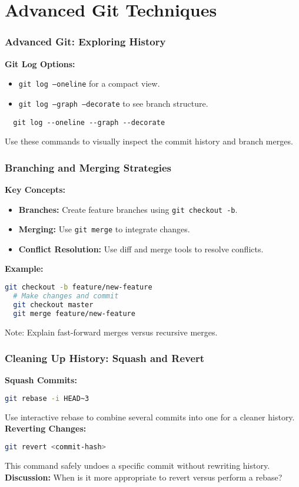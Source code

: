 \documentclass{beamer}
\begin{document}
\section{Advanced Git Techniques}
\begin{frame}[fragile]
	\frametitle{Advanced Git: Exploring History}
	\textbf{Git Log Options:}
	\begin{itemize}
		\item \texttt{git log --oneline} for a compact view.
		\item \texttt{git log --graph --decorate} to see branch structure.
	\end{itemize}
	\vfill
	\lstset{language=bash}
	\begin{lstlisting}
  git log --oneline --graph --decorate
  \end{lstlisting}
	\vfill
	\pause
	Use these commands to visually inspect the commit history and branch merges.
\end{frame}

\begin{frame}[fragile]
	\frametitle{Branching and Merging Strategies}
	\textbf{Key Concepts:}
	\begin{itemize}
		\item \textbf{Branches:} Create feature branches using \texttt{git checkout -b}.
		\item \textbf{Merging:} Use \texttt{git merge} to integrate changes.
		\item \textbf{Conflict Resolution:} Use diff and merge tools to resolve conflicts.
	\end{itemize}
	\vfill
	\textbf{Example:}
	\begin{lstlisting}[language=bash]
  git checkout -b feature/new-feature
  # Make changes and commit
  git checkout master
  git merge feature/new-feature
  \end{lstlisting}
	\vfill
	\alert{Note:} Explain fast-forward merges versus recursive merges.
\end{frame}

\begin{frame}[fragile]
	\frametitle{Cleaning Up History: Squash and Revert}
	\textbf{Squash Commits:}
	\begin{lstlisting}[language=bash]
  git rebase -i HEAD~3
  \end{lstlisting}
	Use interactive rebase to combine several commits into one for a cleaner history.
	\vfill
	\textbf{Reverting Changes:}
	\begin{lstlisting}[language=bash]
  git revert <commit-hash>
  \end{lstlisting}
	This command safely undoes a specific commit without rewriting history.
	\vfill
	\pause
	\textbf{Discussion:} When is it more appropriate to revert versus perform a rebase?
\end{frame}
\end{document}
